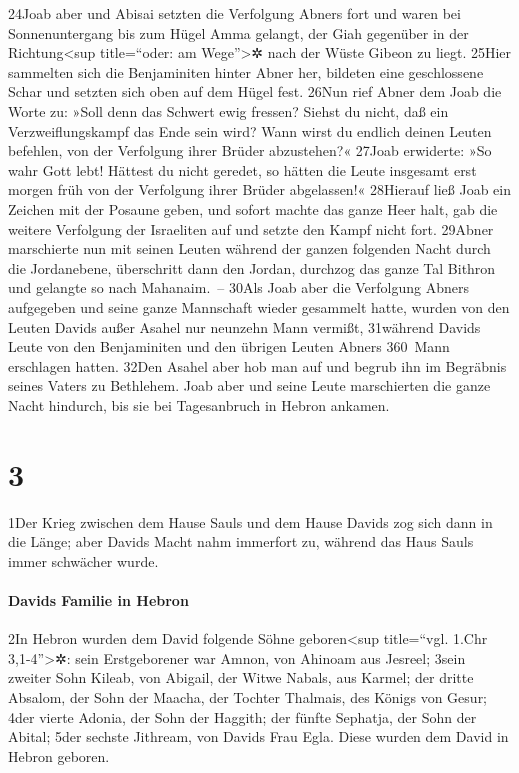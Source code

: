 24Joab aber und Abisai setzten die Verfolgung Abners fort und waren bei
Sonnenuntergang bis zum Hügel Amma gelangt, der Giah gegenüber in der
Richtung\textless sup title=``oder: am Wege''\textgreater✲ nach der
Wüste Gibeon zu liegt. 25Hier sammelten sich die Benjaminiten hinter
Abner her, bildeten eine geschlossene Schar und setzten sich oben auf
dem Hügel fest. 26Nun rief Abner dem Joab die Worte zu: »Soll denn das
Schwert ewig fressen? Siehst du nicht, daß ein Verzweiflungskampf das
Ende sein wird? Wann wirst du endlich deinen Leuten befehlen, von der
Verfolgung ihrer Brüder abzustehen?« 27Joab erwiderte: »So wahr Gott
lebt! Hättest du nicht geredet, so hätten die Leute insgesamt erst
morgen früh von der Verfolgung ihrer Brüder abgelassen!« 28Hierauf ließ
Joab ein Zeichen mit der Posaune geben, und sofort machte das ganze Heer
halt, gab die weitere Verfolgung der Israeliten auf und setzte den Kampf
nicht fort. 29Abner marschierte nun mit seinen Leuten während der ganzen
folgenden Nacht durch die Jordanebene, überschritt dann den Jordan,
durchzog das ganze Tal Bithron und gelangte so nach Mahanaim.~-- 30Als
Joab aber die Verfolgung Abners aufgegeben und seine ganze Mannschaft
wieder gesammelt hatte, wurden von den Leuten Davids außer Asahel nur
neunzehn Mann vermißt, 31während Davids Leute von den Benjaminiten und
den übrigen Leuten Abners 360~Mann erschlagen hatten. 32Den Asahel aber
hob man auf und begrub ihn im Begräbnis seines Vaters zu Bethlehem. Joab
aber und seine Leute marschierten die ganze Nacht hindurch, bis sie bei
Tagesanbruch in Hebron ankamen.

\hypertarget{section-2}{%
\section{3}\label{section-2}}

1Der Krieg zwischen dem Hause Sauls und dem Hause Davids zog sich dann
in die Länge; aber Davids Macht nahm immerfort zu, während das Haus
Sauls immer schwächer wurde.

\hypertarget{davids-familie-in-hebron}{%
\paragraph{Davids Familie in Hebron}\label{davids-familie-in-hebron}}

2In Hebron wurden dem David folgende Söhne geboren\textless sup
title=``vgl. 1.Chr 3,1-4''\textgreater✲: sein Erstgeborener war Amnon,
von Ahinoam aus Jesreel; 3sein zweiter Sohn Kileab, von Abigail, der
Witwe Nabals, aus Karmel; der dritte Absalom, der Sohn der Maacha, der
Tochter Thalmais, des Königs von Gesur; 4der vierte Adonia, der Sohn der
Haggith; der fünfte Sephatja, der Sohn der Abital; 5der sechste
Jithream, von Davids Frau Egla. Diese wurden dem David in Hebron
geboren.

